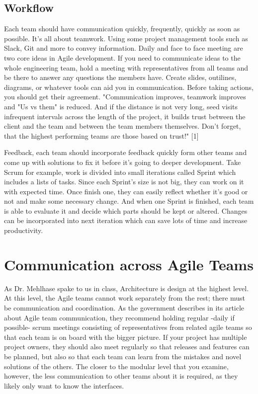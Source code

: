 \documentclass[sigplan,screen]{acmart}
\begin{document}
\subsection{Workflow}
Each team should have communication quickly, frequently, quickly as soon as possible. It's all about teamwork. Using some project management tools such as Slack, Git and more to convey information. Daily and face to face meeting are two core ideas in Agile development. If you need to communicate ideas to the whole engineering team, hold a meeting with representatives from all teams and be there to answer any questions the members have. Create slides, outilines, diagrams, or whatever tools can aid you in communication. \cite{Lulit} Before taking actions, you should get their agreement. "Communication improves, teamwork improves and "Us vs them" is reduced. And if the distance is not very long, seed visits infrequent intervals across the length of the project, it builds trust between the client and the team and between the team members themselves. Don't forget, that the highest performing teams are those based on trust!" [1]

Feedback, each team should incorporate feedback quickly form other teams and come up with solutions to fix it before it's going to deeper development. Take Scrum for example, work is divided into small iterations called Sprint which includes a lists of tasks. Since each Sprint's size is not big, they can work on it with expected time. Once finish one, they can easily reflect whether it's good or not and make some necessary change. And when one Sprint is finished, each team is able to evaluate it and decide which parts should be kept or altered. Changes can be incorporated  into next iteration which can save lots of time and increase productivity.

\section{Communication across Agile Teams}
As Dr. Mehlhase spake to us in class, Architecture is design at the highest level. At this level, the Agile teams cannot work separately from the rest; there must be communication and coordination. As the government describes in its article about Agile team communication, they recommend holding regular -daily if possible- scrum meetings consisting of representatives from related agile teams so that each team is on board with the bigger picture. \cite{Lulit} If your project has multiple project owners, they should also meet regularly so that releases and features can be planned, but also so that each team can learn from the mistakes and novel solutions of the others. \cite{Lulit} The closer to the modular level that you examine, however, the less communication to other teams about it is required, as they likely only want to know the interfaces.
\end{document}
